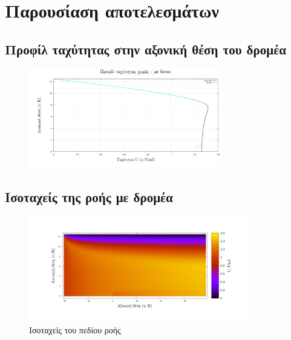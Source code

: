 \section{Παρουσίαση αποτελεσμάτων}

\subsection{Προφίλ ταχύτητας στην αξονική θέση του δρομέα}

\begin{figure}[h!]
    \begin{center}
        \includegraphics[width=0.75\textwidth]{figures/x0_prof.pdf}
    \end{center}
    \label{fig:x0prof}
\end{figure}

\newpage
\subsection{Ισοταχείς της ροής με δρομέα}

\begin{figure}[h!]
    \begin{center}
        \includegraphics[width=0.85\textwidth]{figures/isoU.pdf}
    \end{center}
    \caption{Ισοταχείς του πεδίου ροής}
    \label{fig:isoU}
\end{figure}

